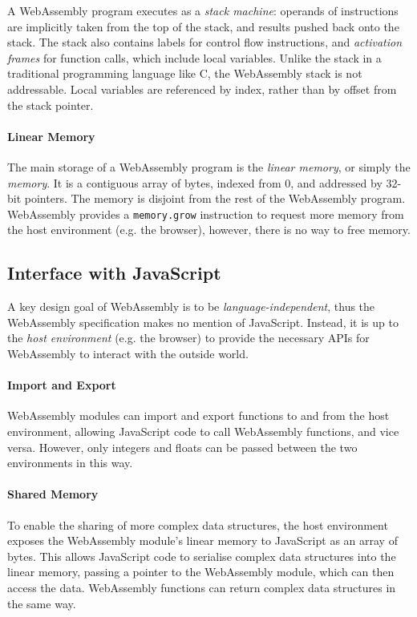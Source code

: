 A WebAssembly program executes as a \emph{stack machine}: operands of instructions are implicitly taken from the top of the stack, and results pushed back onto the stack. The stack also contains labels for control flow instructions, and \emph{activation frames} for function calls, which include local variables. Unlike the stack in a traditional programming language like C, the WebAssembly stack is not addressable. Local variables are referenced by index, rather than by offset from the stack pointer.

\paragraph{Linear Memory}

The main storage of a WebAssembly program is the \emph{linear memory}, or simply the \emph{memory}. It is a contiguous array of bytes, indexed from 0, and addressed by 32-bit pointers. The memory is disjoint from the rest of the WebAssembly program. WebAssembly provides a \texttt{memory.grow} instruction to request more memory from the host environment (e.g. the browser), however, there is no way to free memory.

\subsection{Interface with JavaScript}

A key design goal of WebAssembly is to be \emph{language-independent}, thus the WebAssembly specification makes no mention of JavaScript. Instead, it is up to the \emph{host environment} (e.g. the browser) to provide the necessary APIs for WebAssembly to interact with the outside world.

\paragraph{Import and Export} WebAssembly modules can import and export functions to and from the host environment, allowing JavaScript code to call WebAssembly functions, and vice versa. However, only integers and floats can be passed between the two environments in this way.

\paragraph{Shared Memory} To enable the sharing of more complex data structures, the host environment exposes the WebAssembly module's linear memory to JavaScript as an array of bytes. This allows JavaScript code to serialise complex data structures into the linear memory, passing a pointer to the WebAssembly module, which can then access the data. WebAssembly functions can return complex data structures in the same way.

